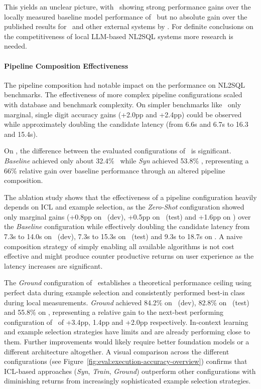 This yields an unclear picture, with \Natural~showing strong
performance gains over the locally measured baseline model performance of
\OmniSQL~but no absolute gain over the published results for \OmniSQL~and other
external systems by \citeauthor{OmniSQL}. For definite conclusions on the
competitiveness of local LLM-based NL2SQL systems more research is needed.

\paragraph{Pipeline Composition Effectiveness}

The pipeline composition had notable impact on the performance on
NL2SQL benchmarks. The effectiveness of more complex pipeline configurations
scaled with database and benchmark complexity. On simpler benchmarks like
\Spider~only marginal, single digit accuracy gains (+2.0pp and +2.4pp) could be
observed while approximately doubling the candidate latency (from 6.6s and 6.7s
to 16.3 and 15.4s).

On \Bird, the difference between the evaluated configurations of \Natural~is
significant. \textit{Baseline} achieved only about 32.4\% \EA~while
\textit{Syn} achieved 53.8\% \EA, representing a 66\% relative gain over
baseline performance through an altered pipeline composition.

The ablation study shows that the effectiveness of a pipeline configuration 
heavily depends on ICL and example selection, as the
\textit{Zero-Shot} configuration showed only marginal gains (+0.8pp on
\Spider~(dev), +0.5pp on \Spider~(test) and +1.6pp on \Bird) over the
\textit{Baseline} configuration while effectively doubling the candidate
latency from 7.3s to 14.0s on \Spider~(dev), 7.3s to 15.3s on \Spider~(test)
and 9.3s to 18.7s on \Bird. A naive composition
strategy of simply enabling all available algorithms is not cost effective
and might produce counter productive returns on user experience as the latency
increases are significant.

The \textit{Ground} configuration of \Natural~establishes a theoretical
performance ceiling using perfect data during example selection and
consistently performed best-in class during local measurements. \textit{Ground}
achieved 84.2\% on \Spider~(dev), 82.8\% on \Spider~(test) and 55.8\% on \Bird,
representing a relative gain to the next-best performing configuration of
\Natural~of +3.4pp, 1.4pp and +2.0pp respectively. In-context
learning and example selection strategies have limits and are already
performing close to them. Further improvements would likely require better
foundation models or a different architecture altogether. A visual comparison
across the different configurations (see
Figure~\ref{fig:eval:execution-accuracy-overview}) confirms that ICL-based
approaches (\textit{Syn}, \textit{Train}, \textit{Ground}) outperform other
configurations with diminishing returns from increasingly sophisticated example
selection strategies.

